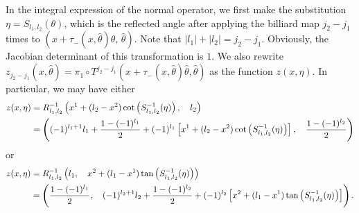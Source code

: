 \documentclass[10pt]{amsart}
\theoremstyle{definition}
\theoremstyle{definition}
\theoremstyle{definition}
\begin{document}
In the integral expression of the normal operator, we first make the substitution $\eta = S_{l_{1},l_{2}}(\theta)$, which is the reflected angle after applying the billiard map $j_{2}-j_{1}$ times to $(x+\tau_{-}(x,\widehat{\theta})\widehat{\theta},\, \widehat{\theta})$. Note that $|l_{1}|+|l_{2}| = j_{2} - j_{1}$. Obviously, the Jacobian determinant of this transformation is $1$. We also rewrite $z_{j_{2}-j_{1}}(x,\widehat{\theta}) = \pi_{1} \circ T^{j_{2}-j_{1}}(x+\tau_{-}(x,\widehat{\theta})\widehat{\theta}, \widehat{\theta})$ as the function $z(x,\eta)$. In particular, we may have either
\begin{align}
z(x,\eta) & = R_{l_{1},l_{2}}^{-1}\left(x^{1} + (l_{2} - x^{2})\cot\left(S_{l_{1},l_{2}}^{-1}(\eta)\right),\quad l_{2}\right)\label{eq:zxeta1}\\
& = \left((-1)^{l_{1}+1}l_{1} + \frac{1-(-1)^{l_{1}}}{2} + (-1)^{l_{1}}\left[ x^{1} + (l_{2} - x^{2})\cot\left(S_{l_{1},l_{2}}^{-1}(\eta)\right) \right], \quad \frac{1-(-1)^{l_{2}}}{2} \right) \notag
\end{align}
or
\begin{align}
z(x,\eta) & = R_{l_{1},l_{2}}^{-1}\left(l_{1}, \quad x^{2} + (l_{1} - x^{1})\tan\left(S_{l_{1},l_{2}}^{-1}(\eta)\right) \right) \label{eq:zxeta2}\\
& = \left(\frac{1-(-1)^{l_{1}}}{2}, \quad (-1)^{l_{2}+1}l_{2} + \frac{1-(-1)^{l_{2}}}{2} + (-1)^{l_{2}}\left[ x^{2} + (l_{1} - x^{1})\tan\left(S_{l_{1},l_{2}}^{-1}(\eta)\right) \right] \right).\notag
\end{align}
\end{document}
